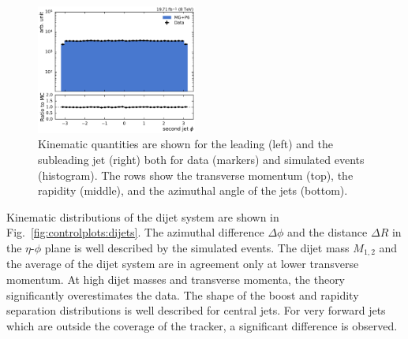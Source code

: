 \begin{figure}[htbp]
    \includegraphics[width=0.47\textwidth]{figures/measurement/jet_quantities_jet2phi.pdf}
    \caption[Kinematic quantities of the jets]{Kinematic quantities are shown
        for the leading (left) and the subleading jet (right) both for data (markers) and
        simulated events (histogram). The rows show the transverse momentum
        (top), the rapidity (middle), and the azimuthal angle of the jets
    (bottom).}
    \label{fig:controlplots:kinematic}
\end{figure}

Kinematic distributions of the dijet system are shown in
Fig.~\ref{fig:controlplots:dijets}. The azimuthal difference $\Delta\phi$ and
the distance $\Delta R$ in the $\eta$-$\phi$ plane is well described by the
simulated events. The dijet mass $M_{1,2}$ and the average \pt of the dijet
system are in agreement only at lower transverse momentum. At high dijet
masses and transverse momenta, the theory significantly overestimates the data.
The shape of the boost and rapidity separation distributions is well described
for central jets. For very forward jets which are outside the coverage of the
tracker, a significant difference is observed.

